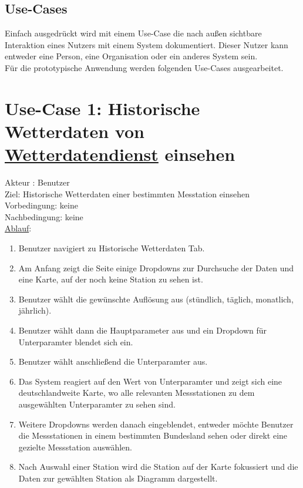 \documentclass[a4paper,12pt]{scrreprt}
\begin{document}
	\subsection{Use-Cases}
	Einfach ausgedrückt wird mit einem Use-Case die nach außen sichtbare Interaktion eines Nutzers mit einem System dokumentiert. Dieser Nutzer kann entweder eine Person, eine Organisation oder ein anderes System sein.\\
	Für die prototypische Anwendung werden folgenden Use-Cases ausgearbeitet.
	\section*{\small \textbf{Use-Case 1: Historische Wetterdaten von \href{https://wetterdienst.readthedocs.io/en/latest/} {Wetterdatendienst} einsehen}}
	Akteur : Benutzer\\
	Ziel: Historische Wetterdaten einer bestimmten Messtation einsehen\\
	Vorbedingung: keine\\
	Nachbedingung: keine\\
	\underline{Ablauf}:
	\begin{enumerate}
		\item Benutzer navigiert zu Historische Wetterdaten Tab.
		\item Am Anfang zeigt die Seite einige Dropdowns zur Durchsuche der Daten und eine Karte, auf der noch keine Station zu sehen ist.
		\item Benutzer wählt die gewünschte Auflösung aus (stündlich, täglich, monatlich, jährlich).
		\item Benutzer wählt dann die Hauptparameter aus und ein Dropdown für Unterparamter blendet sich ein.
		\item Benutzer wählt anschließend die Unterparamter aus.
		\item Das System reagiert auf den Wert von Unterparamter und zeigt sich eine deutschlandweite Karte, wo alle relevanten Messstationen zu dem ausgewählten Unterparamter zu sehen sind. 
		\item Weitere Dropdowns werden danach eingeblendet, entweder möchte Benutzer die Messstationen in einem bestimmten Bundesland sehen oder direkt eine gezielte Messstation auswählen.
		\item Nach Auswahl einer Station wird die Station auf der Karte fokussiert und die Daten zur gewählten Station als Diagramm dargestellt. 
	\end{enumerate}
\end{document}
